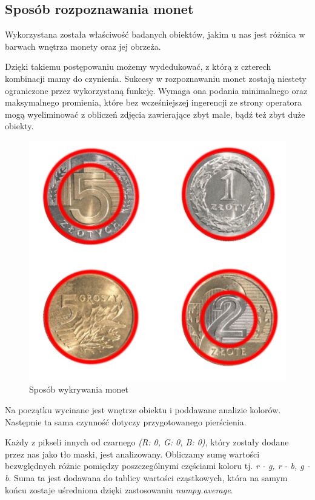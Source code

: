 \documentclass{mwart}
\begin{document}
\subsection{Sposób rozpoznawania monet}

Wykorzystana została właściwość badanych obiektów, jakim u nas jest różnica w barwach wnętrza monety oraz jej obrzeża.

Dzięki takiemu postępowaniu możemy wydedukować, z którą z czterech kombinacji mamy do czynienia. Sukcesy w rozpoznawaniu monet zostają niestety ograniczone przez wykorzystaną funkcję. Wymaga ona podania minimalnego oraz maksymalnego promienia, które bez wcześniejszej ingerencji ze strony operatora mogą wyeliminować z obliczeń zdjęcia zawierające zbyt małe, bądź też zbyt duże obiekty.

\begin{figure}[H]
    \centering
    \includegraphics[width=\textwidth]{money.png}
    \caption{Sposób wykrywania monet}
\end{figure}

Na początku wycinane jest wnętrze obiektu i poddawane analizie kolorów. Następnie ta sama czynność dotyczy przygotowanego pierścienia.

Każdy z pikseli innych od czarnego \textit{(R: 0, G: 0, B: 0)}, który zostały dodane przez nas jako tło maski, jest analizowany. Obliczamy sumę wartości bezwględnych różnic pomiędzy poszczególnymi częściami koloru tj. \textit{r - g, r - b, g - b}. Suma ta jest dodawana do tablicy wartości cząstkowych, która na samym końcu zostaje uśredniona dzięki zastosowaniu \textit{numpy.average}.
\end{document}
